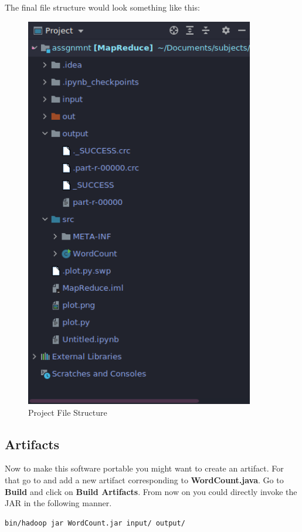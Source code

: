 \documentclass[10pt]{report}
\begin{document}
The final file structure would look something like this:
\begin{figure}[h]
        \includegraphics[width=10cm]{FileStructure.png}
        \centering
        \caption{Project File Structure}
        \centering
\end{figure}
\clearpage

\subsection{Artifacts}

Now to make this software portable you might want to create an artifact. For
that go to  and add a new artifact
corresponding to \textbf{WordCount.java}. Go to \textbf{Build} and click on
\textbf{Build Artifacts}. From now on you could directly invoke the JAR in the
following manner.

\begin{verbatim}
bin/hadoop jar WordCount.jar input/ output/
\end{verbatim}
\end{document}
